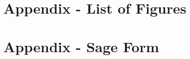\printbibliography

\appendix

\section{Appendix - List of Figures}
\listoffigures
\newpage

\section{Appendix - Sage Form}


